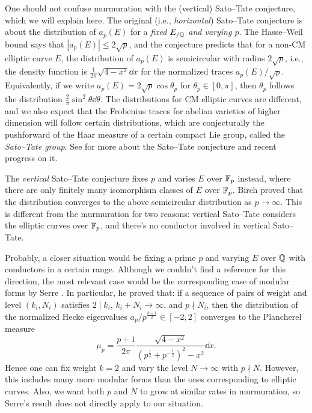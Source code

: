 One should not confuse murmuration with the (vertical) Sato--Tate conjecture, which we will explain here.
The original (i.e., \emph{horizontal}) Sato--Tate conjecture is about the distribution of $a_p(E)$ for a \emph{fixed $E_{/\mathbb{Q}}$ and varying $p$}.
The Hasse--Weil bound says that $|a_p(E)| \le 2 \sqrt{p}$, and the conjecture predicts that for a non-CM elliptic curve $E$, the distribution of $a_p(E)$ is semicircular with radius $2\sqrt{p}$, i.e., the density function is $\frac{1}{2\pi}\sqrt{4 - x^2} \dd x$ for the normalized traces $a_p(E)/\sqrt{p}$.
Equivalently, if we write $a_p(E) = 2 \sqrt{p} \cos \theta_p$ for $\theta_p \in [0, \pi]$, then $\theta_p$ follows the distribution $\frac{2}{\pi} \sin^2 \theta \dd \theta$.
The distributions for CM elliptic curves are different, and we also expect that the Frobenius traces for abelian varieties of higher dimension will follow certain distributions, which are conjecturally the pushforward of the Haar measure of a certain compact Lie group, called the \emph{Sato--Tate group}.
See \cite{sutherland2019sato} for more about the Sato--Tate conjecture and recent progress on it.


The \emph{vertical} Sato--Tate conjecture fixes $p$ and varies $E$ over $\mathbb{F}_p$ instead, where there are only finitely many isomorphism classes of $E$ over $\mathbb{F}_p$.
Birch \cite{birch1968number} proved that the distribution converges to the above semicircular distribution as $p \to \infty$.
This is different from the murmuration for two reasons: vertical Sato--Tate considers the elliptic curves over $\mathbb{F}_p$, and there's no conductor involved in vertical Sato--Tate.

Probably, a closer situation would be fixing a prime $p$ and varying $E$ over $\mathbb{Q}$ with conductors in a certain range.
Although we couldn't find a reference for this direction, the most relevant case would be the corresponding case of modular forms by Serre \cite{serre1997repartition}.
In particular, he proved that: if a sequence of pairs of weight and level $(k_i, N_i)$ satisfies $2 \mid k_i$, $k_i + N_i \to \infty$, and $p \nmid N_i$, then the distribution of the normalized Hecke eigenvalues $a_p / p^{\frac{k-1}{2}} \in [-2, 2]$ converges to the Plancherel measure
\[
\mu_p = \frac{p+1}{2\pi} \frac{\sqrt{4 - x^2}}{(p^{\frac{1}{2}} + p^{-\frac{1}{2}})^2 - x^2} \dd x.
\]
Hence one can fix weight $k = 2$ and vary the level $N \to \infty$ with $p \nmid N$.
However, this includes many more modular forms than the ones corresponding to elliptic curves.
Also, we want both $p$ and $N$ to grow at similar rates in murmuration, so Serre's result does not directly apply to our situation.
